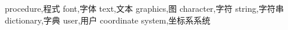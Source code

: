 
procedure,程式
font,字体
text,文本
graphics,图
character,字符
string,字符串
dictionary,字典
user,用户
coordinate system,坐标系系统
